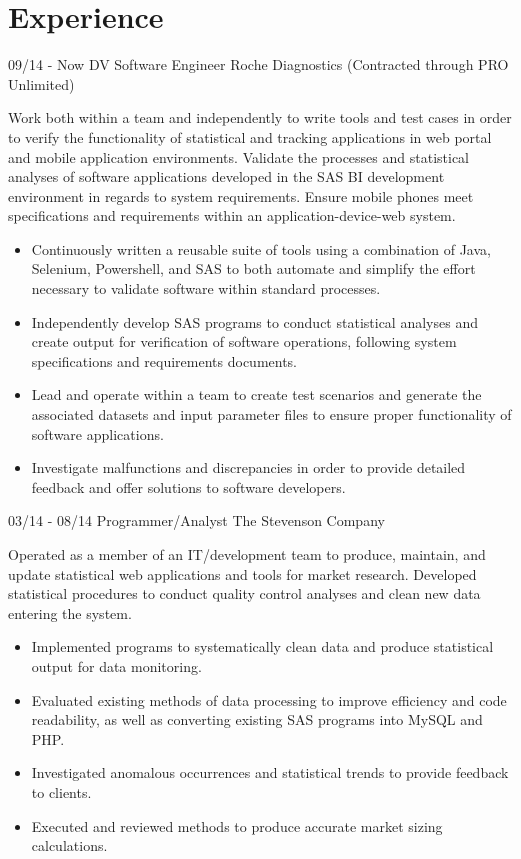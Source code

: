 \documentclass[]{moak-resume}
\begin{document}
\section{Experience}
\begin{entrylist}
  \entry
    {09/14 - Now}
    {DV Software Engineer}
    {Roche Diagnostics (Contracted through PRO Unlimited)}
    {Work both within a team and independently to write tools and test cases in order to verify the functionality of statistical and tracking applications in web portal and mobile application environments. Validate the processes and statistical analyses of software applications developed in the SAS BI development environment in regards to system requirements. Ensure mobile phones meet specifications and requirements within an application-device-web system.
    	\begin{itemize}
    		\item Continuously written a reusable suite of tools using a combination of Java, Selenium, Powershell, and SAS to both automate and simplify the effort necessary to validate software within standard processes.
    		\item Independently develop SAS programs to conduct statistical analyses and create output for verification of software operations, following system specifications and requirements documents.
    		\item Lead and operate within a team to create test scenarios and generate the associated datasets and input parameter files to ensure proper functionality of software applications.
    		\item Investigate malfunctions and discrepancies in order to provide detailed feedback and offer solutions to software developers.
    	\end{itemize}}
  \entry
    {03/14 - 08/14}
    {Programmer/Analyst}
    {The Stevenson Company}
    {Operated as a member of an IT/development team to produce, maintain, and update statistical web applications and tools for market research. Developed statistical procedures to conduct quality control analyses and clean new data entering the system.
    	\begin{itemize} 
    		\item Implemented programs to systematically clean data and produce statistical output for data monitoring.
     		\item Evaluated existing methods of data processing to improve efficiency and code readability, as well as converting existing SAS programs into MySQL and PHP.
     		\item Investigated anomalous occurrences and statistical trends to provide feedback to clients.
     		\item Executed and reviewed methods to produce accurate market sizing calculations.
    	\end{itemize}}
\end{entrylist}
\\
\newpage
\end{document}
